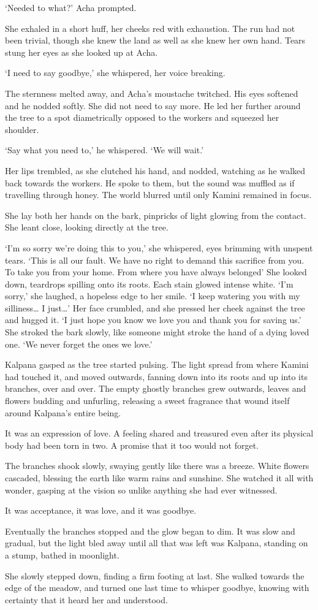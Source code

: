 `Needed to what?' Acha prompted.

She exhaled in a short huff, her cheeks red with exhaustion. The run
had not been trivial, though she knew the land as well as she knew her
own hand. Tears stung her eyes as she looked up at Acha.

`I need to say goodbye,' she whispered, her voice breaking.

The sternness melted away, and Acha's moustache twitched. His eyes
softened and he nodded softly. She did not need to say more. He led
her further around the tree to a spot diametrically opposed to the
workers and squeezed her shoulder.

`Say what you need to,' he whispered. `We will wait.'

Her lips trembled, as she clutched his hand, and nodded, watching as
he walked back towards the workers. He spoke to them, but the sound
was muffled as if travelling through honey. The world blurred until
only Kamini remained in focus.

She lay both her hands on the bark, pinpricks of light glowing from
the contact. She leant close, looking directly at the tree.

`I'm so sorry we're doing this to you,' she whispered, eyes brimming
with unspent tears. `This is all our fault. We have no right to demand
this sacrifice from you. To take you from your home. From where you
have always belonged\textellipsis' She looked down, teardrops spilling onto its
roots. Each stain glowed intense white. `I'm sorry,' she laughed, a
hopeless edge to her smile. `I keep watering you with my silliness… I
just…' Her face crumbled, and she pressed her cheek against the tree
and hugged it. `I just hope you know we love you and thank you for
saving us.' She stroked the bark slowly, like someone might stroke the
hand of a dying loved one. `We never forget the ones we love.'

Kalpana gasped as the tree started pulsing. The light spread from
where Kamini had touched it, and moved outwards, fanning down into its
roots and up into its branches, over and over. The empty ghostly
branches grew outwards, leaves and flowers budding and unfurling,
releasing a sweet fragrance that wound itself around Kalpana's entire
being.

It was an expression of love. A feeling shared and treasured even
after its physical body had been torn in two. A promise that it too
would not forget.

The branches shook slowly, swaying gently like there was a
breeze. White flowers cascaded, blessing the earth like warm rains and
sunshine. She watched it all with wonder, gasping at the vision so
unlike anything she had ever witnessed.

It was acceptance, it was love, and it was goodbye.

Eventually the branches stopped and the glow began to dim. It was slow
and gradual, but the light bled away until all that was left was
Kalpana, standing on a stump, bathed in moonlight.

She slowly stepped down, finding a firm footing at last. She walked
towards the edge of the meadow, and turned one last time to whisper
goodbye, knowing with certainty that it heard her and understood.
